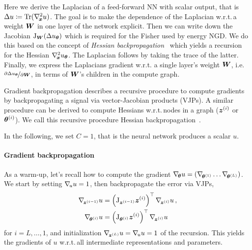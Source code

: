 Here we derive the Laplacian of a feed-forward NN with scalar output, that is $\Delta u \coloneqq \operatorname{Tr}(\nabla_{\!{{\bm{x}}}}^{2} u)$.
The goal is to make the dependence of the Laplacian w.r.t.\,a weight ${\bm{W}}$ in one layer of the network explicit.
Then we can write down the Jacobian $\mathrm{J}_{{\bm{W}}}(\Delta u_{{\bm{\theta}}})$ which is required for the Fisher used by energy NGD.
We do this based on the concept of \emph{Hessian backpropagation}~\citep[HBP,]{dangel2020modular} which yields a recursion for the Hessian $\nabla_{\!{{\bm{x}}}}^{2}u_{{\bm{\theta}}}$.
The Laplacian follows by taking the trace of the latter.
Finally, we express the Laplacians gradient w.r.t.
a single layer's weight ${\bm{W}}$, i.e.\,$\nicefrac{\partial \Delta u_{{\bm{\theta}}}}{\partial {\bm{W}}}$, in terms of ${\bm{W}}$'s children in the compute graph.


Gradient backpropagation describes a recursive procedure to compute gradients by backpropagating a signal via vector-Jacobian products (VJPs).
A similar procedure can be derived to compute Hessians w.r.t.\,nodes in a graph (${\bm{z}}^{(i)}$ or ${\bm{\theta}}^{(i)}$).
We call this recursive procedure Hessian backpropagation~\citep{dangel2020modular}.

In the following, we set $C = 1$, that is the neural network produces a scalar $u$.

\paragraph{Gradient backpropagation} As a warm-up, let's recall how to compute the gradient $\nabla_{\!{{\bm{\theta}}}}u =
(\nabla_{\!{{\bm{\theta}}^{(1)}}} \dots \nabla_{\!{{\bm{\theta}}^{(L)}}})$. We start by setting $\nabla_{\!{u}}
u = 1$, then backpropagate the error via VJPs,
\begin{align}\label{eq:gradient-backpropagation}
  \begin{split}
    \nabla_{\!{{\bm{z}}^{(i-1)}}}u
    &=
      \left( \mathrm{J}_{{\bm{z}}^{(i-1)}} {\bm{z}}^{(i)} \right)^{\top} \nabla_{\!{{\bm{z}}^{(i)}}}u\,,
    \\
    \nabla_{\!{{\bm{\theta}}^{(i)}}}u
    &=
      \left( \mathrm{J}_{{\bm{\theta}}^{(i)}} {\bm{z}}^{(i)} \right)^{\top} \nabla_{\!{{\bm{z}}^{(i)}}}u\,
  \end{split}
\end{align}
for $i = L, \dots, 1$, and initialization $\nabla_{\!{{\bm{z}}^{(L)}}}u = \nabla_{\!{u}}u = 1$ of the recursion.
This yields the gradients of $u$ w.r.t.\,all intermediate representations and parameters.

